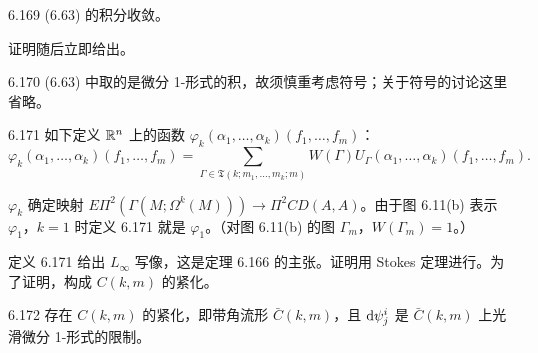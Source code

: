 \begin{lemma}{6.169}
  (6.63) 的积分收敛。
\end{lemma}

证明随后立即给出。

\begin{remark}{6.170}
  (6.63) 中取的是微分 1-形式的积，故须慎重考虑符号；关于符号的讨论这里省略。
\end{remark}

\begin{definition}{6.171}
  如下定义 $\mathbb{R}^n$ 上的函数 $\varphi_k(\alpha_1,\dots,\alpha_k)(f_1,\dots,f_m)$：
  \[
    \varphi_k(\alpha_1,\dots,\alpha_k)(f_1,\dots,f_m)=\sum_{\Gamma\in\mathfrak{T}(k;m_1,\dots,m_k;m)}W(\Gamma)U_\Gamma(\alpha_1,\dots,\alpha_k)(f_1,\dots,f_m).
  \]
\end{definition}

$\varphi_k$ 确定映射 $E\Pi^2(\Gamma(M;\Omega^k(M)))\to\Pi^2CD(A,A)$。由于图 6.11(b) 表示 $\varphi_1$，$k=1$ 时定义 6.171 就是 $\varphi_1$。（对图 6.11(b) 的图 $\Gamma_m$，$W(\Gamma_m)=1$。）

定义 6.171 给出 $L_{\infty}$ 写像，这是定理 6.166 的主张。证明用 Stokes 定理进行。为了证明，构成 $C(k,m)$ 的紧化。

\begin{lemma}{6.172}
  存在 $C(k,m)$ 的紧化，即带角流形 $\bar C(k,m)$，且 $\mathrm{d}\psi^i_j$ 是 $\bar C(k,m)$ 上光滑微分 1-形式的限制。
\end{lemma}

